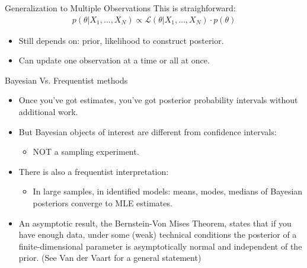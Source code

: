 \documentclass[aspectratio=169]{beamer}
\begin{document}
\begin{frame}{Generalization to Multiple Observations}
This is straighforward:
\begin{align*}
p(\theta | X_{1}, \ldots, X_{N}) \propto \mathcal{L}(\theta | X_{1}, \ldots, X_{N}) \cdot p(\theta)
\end{align*}
\begin{itemize}
\item Still depends on: \alert{prior}, \alert{likelihood} to construct \alert{posterior}.
\item Can update one observation at a time or all at once.
\end{itemize}
\end{frame}

\begin{frame}{Bayesian Vs. Frequentist methods}
\begin{itemize}
\item Once you've got estimates, you've got posterior probability intervals
without additional work.
\item But Bayesian objects of interest are different from confidence intervals:
\begin{itemize}
\item NOT a sampling experiment.
\end{itemize}
\item There is also a frequentist interpretation: 
\begin{itemize}
\item In large samples, in identified models: means, modes, medians of Bayesian
posteriors converge to MLE estimates.
\end{itemize}
\item An asymptotic result, the Bernstein-Von Mises Theorem, states that
if you have enough data, under some (weak) technical conditions the
posterior of a finite-dimensional parameter is asymptotically normal
and independent of the prior.  (See Van der Vaart for a general statement)
\end{itemize}
\end{frame}
\end{document}
